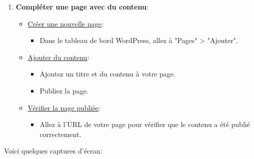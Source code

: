 \documentclass[a4paper,11pt]{article}
\begin{document}
\begin{enumerate}
\begin{itemize}
                        \end{itemize}
                    
                    \newpage
                    \item \textbf{Compléter une page avec du contenu}:
                        \begin{itemize}
                            \item \underline{Créer une nouvelle page}:
                                \begin{itemize}
                                    \item Dans le tableau de bord WordPress, allez à "Pages" > "Ajouter".
                                \end{itemize}
                            \item \underline{Ajouter du contenu}:
                                \begin{itemize}
                                    \item Ajoutez un titre et du contenu à votre page.
                                    \item Publiez la page.
                                \end{itemize}
                            \item \underline{Vérifier la page publiée}:
                                \begin{itemize}
                                    \item Allez à l'URL de votre page pour vérifier que le contenu a été publié correctement.
                                \end{itemize}
                        \end{itemize}
                \end{enumerate}

                \noindent Voici quelques captures d'écran: 
\end{document}

